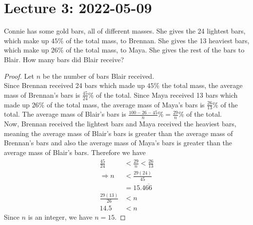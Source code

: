 \documentclass[12pt]{article}
\begin{document}
    \newpage
    \section{Lecture 3: 2022-05-09}
    \begin{myprob}{}{}
        Connie has some gold bars, all of different masses. She gives the 24 lightest bars, which make up $45\%$ of the total mass, to Brennan. She gives the 13 heaviest bars, which make up $26\%$ of the total mass, to Maya. She gives the rest of the bars to Blair. How many bars did Blair receive?

        \begin{proof}
            Let $n$ be the number of bars Blair received.\\
            
            Since Brennan received 24 bars which made up $45\%$ the total mass, the average mass of Brennan's bars is $\frac{45}{24}\%$ of the total. Since Maya received 13 bars which made up $26\%$ of the total mass, the average mass of Maya's bars is $\frac{26}{13}\%$ of the total. The average mass of Blair's bars is $\frac{100-26-45}{n}\%=\frac{29}{n}\%$ of the total.\\

            Now, Brennan received the lightest bars and Maya received the heaviest bars, meaning the average mass of Blair's bars is greater than the average mass of Brennan's bars and also the average mass of Maya's bars is greater than the average mass of Blair's bars. Therefore we have
            \begin{align*}
                \frac{45}{24}&<\frac{29}{n}<\frac{26}{13}\\
                \Longrightarrow n&<\frac{29(24)}{45}\\
                &=15.4\overline{66}\\
                \frac{29(13)}{26}&<n\\
                14.5&<n
            \end{align*}
            Since $n$ is an integer, we have $n=15$.
        \end{proof}
    \end{myprob}
\end{document}
